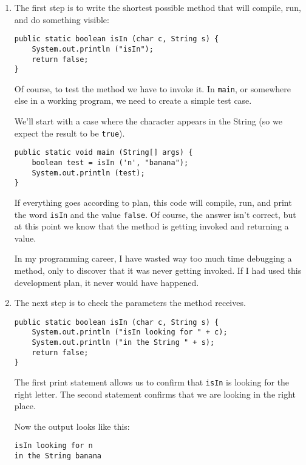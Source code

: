 \documentclass{book}
\begin{document}
\begin{enumerate}

\item The first step is to write the shortest possible method
that will compile, run, and do something visible:

\begin{verbatim}
public static boolean isIn (char c, String s) {
    System.out.println ("isIn");
    return false;
}
\end{verbatim}

Of course, to test the method we have to invoke it.  In
{\tt main}, or somewhere else in a working program, we need
to create a simple test case.

We'll start with a case where the character appears in the
String (so we expect the result to be {\tt true}).

\begin{verbatim}
public static void main (String[] args) {
    boolean test = isIn ('n', "banana");
    System.out.println (test);
}
\end{verbatim}

If everything goes according to plan, this code will compile,
run, and print the word {\tt isIn} and the value {\tt false}.
Of course, the answer isn't correct, but at this point we know
that the method is getting invoked and returning a value.

In my programming career, I have wasted way too much time debugging
a method, only to discover that it was never getting invoked.
If I had used this development plan, it never would have happened.

\item The next step is to check the parameters the method
receives.

\begin{verbatim}
public static boolean isIn (char c, String s) {
    System.out.println ("isIn looking for " + c);
    System.out.println ("in the String " + s);
    return false;
}
\end{verbatim}

The first print statement allows us to confirm that {\tt isIn}
is looking for the right letter.  The second statement confirms
that we are looking in the right place.

Now the output looks like this:

\begin{verbatim}
isIn looking for n
in the String banana
\end{verbatim}


\end{enumerate}
\end{document}
